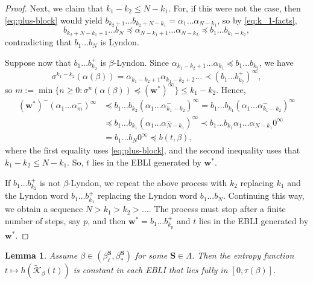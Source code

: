 \documentclass[11pt]{amsart}
\newtheorem{lemma}[theorem]{Lemma}
\theoremstyle{definition}
\theoremstyle{remark}
\numberwithin{equation}{section}
\newcommand{\Kt}{\widetilde{\mathcal{K}}}
\newcommand{\cs}{ {\mathbf{S}}}
\newcommand{\w}{\mathbf{w}}
\newcommand{\f}{\infty}
\newcommand{\al}{\alpha}
\newcommand{\lle}{\preccurlyeq}
\newcommand{\si}{\sigma}
\newcommand{\La}{\Lambda}
\begin{document}
\begin{proof}

{Next, we claim that $k_1-k_2\leq N-k_1$. For, if this were not the case, then \eqref{eq:plus-block} would yield} $b_{k_2+1}\dots b_{k_2+N-k_1}=\al_1\dots\al_{N-k_1}$, so by \eqref{eq:k_1-facts},
\[
b_{k_2+N-k_1+1}\dots b_N \lle \al_{N-k_1+1}\dots\al_{N-k_2}\lle b_1\dots b_{k_1-k_2},
\]
contradicting that $b_1\dots b_N$ is Lyndon. %

Suppose now that $b_1\dots b_{k_2}^+$ is $\beta$-Lyndon. Since $\al_{k_1-k_2+1}\dots \al_{k_1}\lle b_1\dots b_{k_2}$, we have
\[
\si^{k_1-k_2}(\al(\beta))=\al_{k_1-k_2+1}\al_{k_1-k_2+2}\dots \prec (b_1\dots b_{k_2}^+)^\f,
\]
so $m:=\min\{n\geq 0: \si^n(\al(\beta))\lle (\w^*)^\f\}\leq k_1-k_2$. Hence,
\begin{align*}
(\w^*)^-(\al_1\dots\al_m^-)^\f & \lle b_1\dots b_{k_2}(\al_1\dots\al_{k_1-k_2}^-)^\f
=b_1\dots b_{k_1}(\al_1\dots\al_{k_1-k_2}^-)^\f \\
&\lle b_1\dots b_{k_1}(\al_1\dots\al_{N-k_1}^-)^\f \prec b_1\dots b_{k_1}\al_1\dots\al_{N-k_1}0^\f\\
&=b_1\dots b_N 0^\f\lle b(t,\beta),
\end{align*}
where the first equality uses \eqref{eq:plus-block}, and the second inequality uses that $k_1-k_2\leq N-k_1$. So, $t$ lies in the EBLI generated by $\w^*$.

If $b_1\dots b_{k_2}^+$ is not $\beta$-Lyndon, we repeat the above process with $k_2$ replacing $k_1$ and the Lyndon word $b_1\dots b_{k_1}^+$ replacing the Lyndon word $b_1\dots b_N$. Continuing this way, we obtain a sequence $N>k_1>k_2>\dots$. The process must stop after a finite number of steps, say $p$, and then $\w^*=b_1\dots b_{k_p}^+$ and $t$ lies in the EBLI generated by $\w^*$.
\end{proof}

\begin{lemma} \label{lem:EBLI-constant-entropy}
Assume $\beta\in(\beta_\ell^\cs,\beta_*^\cs)$ for some $\cs\in\La$. Then the entropy function $t\mapsto h(\Kt_\beta(t))$ is constant in each EBLI that lies fully in $[0,\tau(\beta)]$.
\end{lemma}
\end{document}
